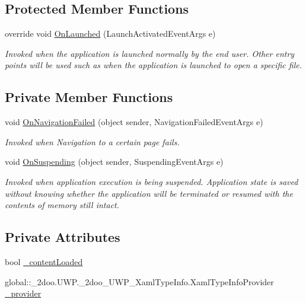 \subsection*{Protected Member Functions}
\begin{CompactItemize}
\item 
override void \hyperlink{class__2doo_1_1_u_w_p_1_1_app_fb3a2a0edc517e7505e611ff4ae0e8c2}{OnLaunched} (LaunchActivatedEventArgs e)
\begin{CompactList}\small\item\em Invoked when the application is launched normally by the end user. Other entry points will be used such as when the application is launched to open a specific file. \item\end{CompactList}\end{CompactItemize}
\subsection*{Private Member Functions}
\begin{CompactItemize}
\item 
void \hyperlink{class__2doo_1_1_u_w_p_1_1_app_2d5f47e28d011efc564daa7965ab010e}{OnNavigationFailed} (object sender, NavigationFailedEventArgs e)
\begin{CompactList}\small\item\em Invoked when Navigation to a certain page fails. \item\end{CompactList}\item 
void \hyperlink{class__2doo_1_1_u_w_p_1_1_app_7f85cfd8651c73a9a0d6d60da06317b7}{OnSuspending} (object sender, SuspendingEventArgs e)
\begin{CompactList}\small\item\em Invoked when application execution is being suspended. Application state is saved without knowing whether the application will be terminated or resumed with the contents of memory still intact. \item\end{CompactList}\end{CompactItemize}
\subsection*{Private Attributes}
\begin{CompactItemize}
\item 
bool \hyperlink{class__2doo_1_1_u_w_p_1_1_app_3105674852bc85e875b4dd01465cd8ce}{\_\-contentLoaded}
\item 
global::\_\-2doo.UWP.\_\-2doo\_\-UWP\_\-XamlTypeInfo.XamlTypeInfoProvider \hyperlink{class__2doo_1_1_u_w_p_1_1_app_23b305ac503ed70611fb8e448ab6f831}{\_\-provider}
\end{CompactItemize}



